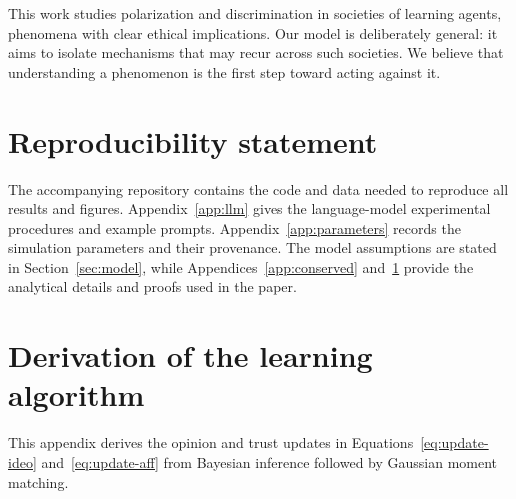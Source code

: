 \documentclass{article}
\begin{document}
This work studies polarization and discrimination in societies of learning
agents, phenomena with clear ethical implications. Our model is deliberately
general: it aims to isolate mechanisms that may recur across such societies. We believe
that understanding a phenomenon is the first step toward acting against it.

\section*{Reproducibility statement}

The accompanying repository contains the code and data needed to reproduce all
results and figures. Appendix~\ref{app:llm} gives the language-model experimental
procedures and example prompts. Appendix~\ref{app:parameters} records the
simulation parameters and their provenance. The model assumptions are stated in
Section~\ref{sec:model}, while Appendices~\ref{app:conserved}
and~\ref{app:derivation} provide the analytical details and
proofs used in the paper.




\appendix
\section{Derivation of the learning algorithm}
\label{app:derivation}

This appendix derives the opinion and trust updates in
Equations~\eqref{eq:update-ideo} and~\eqref{eq:update-aff} from Bayesian inference
followed by Gaussian moment matching.
\end{document}
